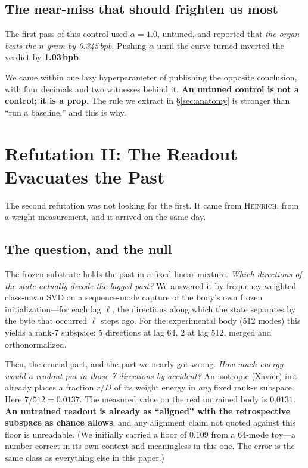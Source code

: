 \documentclass[11pt,a4paper]{article}
\newcommand{\heinrich}{\textsc{Heinrich}}
\newcommand{\bpb}{\,bpb}
\begin{document}
\subsection{The near-miss that should frighten us most}

The first pass of this control used $\alpha = 1.0$, untuned, and reported that
\emph{the organ beats the $n$-gram by 0.345\bpb}. Pushing $\alpha$ until the curve
turned inverted the verdict by \textbf{1.03\bpb}.

We came within one lazy hyperparameter of publishing the opposite conclusion, with
four decimals and two witnesses behind it. \textbf{An untuned control is not a
control; it is a prop.} The rule we extract in \S\ref{sec:anatomy} is stronger than
``run a baseline,'' and this is why.

\section{Refutation II: The Readout Evacuates the Past}
\label{sec:evacuation}

The second refutation was not looking for the first. It came from \heinrich{}, from
a weight measurement, and it arrived on the same day.

\subsection{The question, and the null}

The frozen substrate holds the past in a fixed linear mixture. \emph{Which
directions of the state actually decode the lagged past?} We answered it by
frequency-weighted class-mean SVD on a sequence-mode capture of the body's own
frozen initialization---for each lag $\ell$, the directions along which the state
separates by the byte that occurred $\ell$ steps ago. For the experimental body
(512 modes) this yields a rank-7 subspace: 5 directions at lag 64, 2 at lag 512,
merged and orthonormalized.

Then, the crucial part, and the part we nearly got wrong. \emph{How much energy
would a readout put in those 7 directions by accident?} An isotropic (Xavier) init
already places a fraction $r/D$ of its weight energy in \emph{any} fixed rank-$r$
subspace. Here $7/512 = \mathbf{0.0137}$. The measured value on the real untrained
body is $0.0131$. \textbf{An untrained readout is already as ``aligned'' with the
retrospective subspace as chance allows}, and any alignment claim not quoted
against this floor is unreadable. (We initially carried a floor of $0.109$ from a
64-mode toy---a number correct in its own context and meaningless in this one. The
error is the same class as everything else in this paper.)
\end{document}
